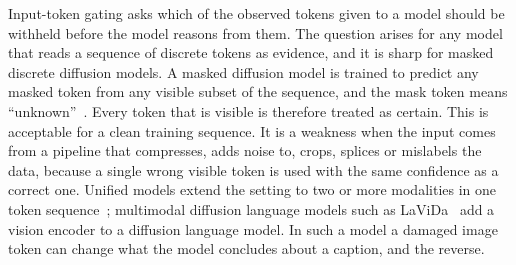 
Input-token gating asks which of the observed tokens given to a model should be withheld before the model reasons from
them.
The question arises for any model that reads a sequence of discrete tokens as evidence, and it is sharp for masked
discrete diffusion models.
A masked diffusion model is trained to predict any masked token from any visible subset of the sequence, and the mask
token means ``unknown''~\cite{austin2021d3pm,sahoo2024mdlm,ou2025radd}.
Every token that is visible is therefore treated as certain.
This is acceptable for a clean training sequence.
It is a weakness when the input comes from a pipeline that compresses, adds noise to, crops, splices or mislabels the data,
because a single wrong visible token is used with the same confidence as a correct one.
Unified models extend the setting to two or more modalities in one token sequence~\cite{swerdlow2025unidisc,yang2025mmada,shi2025muddit}; multimodal diffusion language models such as
LaViDa~\cite{li2025lavida} add a vision encoder to a diffusion language model.
In such a model a damaged image token can change what the model concludes about a caption, and the reverse.

